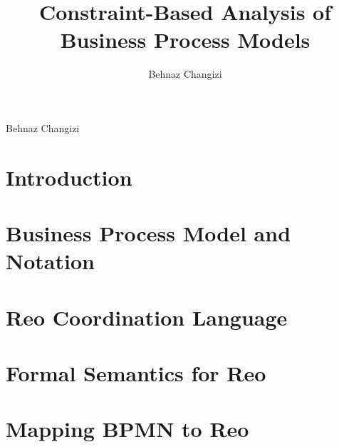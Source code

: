 \documentclass[runnngheads]{book}
\author{Behnaz Changizi}
\renewcommand{\maketitle}
{
	\singlespacing
	\thispagestyle{empty}
	\vspace*{\fill} \vspace{150pt} \begin{center}
		\Huge \textcolor{black} \thetitle \normalsize 
	
	\sc \vspace{100pt}
	Behnaz Changizi %
%	
%	
%	
%	
	\end{center}
	\vspace*{\fill}
}
\begin{document}
\title{Constraint-Based Analysis of Business Process Models}
\pagestyle{empty}
\maketitle
\newpage
\newpage
\vspace*{20cm}


\thispagestyle{empty}
\frontmatter
\tableofcontents



\newsavebox\behbox
\begin{lrbox}{\behbox}
\end{lrbox}





\thispagestyle{empty}
\lstlistoflistings

\thispagestyle{empty}
\listoffigures 


\thispagestyle{empty}
\listoftables


\onehalfspacing

\pagestyle{plain}
\clearpage

\mainmatter
\chapter{Introduction}

\chapter{Business Process Model and Notation}
\label{ch:bpmn}

\chapter{Reo Coordination Language}
\label{ch:reo}

\chapter{Formal Semantics for Reo}
\label{ch:formsem}


\chapter{Mapping BPMN to Reo}
\label{ch:mapping}

\end{document}
